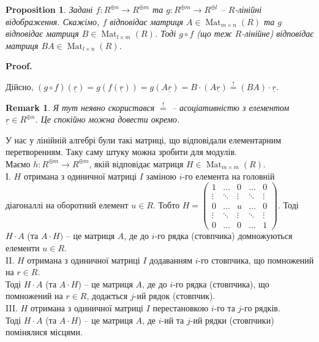 \documentclass[a4paper, 10pt]{article}
\makeatletter
\theoremstyle{theoremdd}
\theoremstyle{theoremdd}
\theoremstyle{theoremdd}
\theoremstyle{theoremdd}
\theoremstyle{theoremdd}
\theoremstyle{theoremdd}
\theoremstyle{theoremdd}
\theoremstyle{theoremdd}
\theoremstyle{theoremdd}
\newtheorem{proposition}[theorem]{Proposition}
\theoremstyle{theoremdd}
\theoremstyle{theoremdd}
\newtheorem{remark}[theorem]{Remark}
\theoremstyle{theoremdd}
\theoremstyle{theoremdd}
\theoremstyle{theoremdd}
\theoremstyle{theoremdd}
\renewenvironment{proof}[1][Proof.\\]{\par
\pushQED{\hfill \qed}%
\normalfont \topsep6\p@\@plus6\p@\relax
\trivlist
\item\relax
{\bfseries
#1\@addpunct{.}}\hspace\labelsep\ignorespaces
}{%
\popQED\endtrivlist\@endpefalse
}
\DeclareMathOperator{\Mat}{Mat}
\makeatother
\begin{document}
\begin{proposition}
Задані $f \colon R^{\oplus n} \to R^{\oplus m}$ та $g \colon R^{\oplus m} \to R^{\oplus l}$ -- $R$-лінійні відображення. Скажімо, $f$ відповідає матриця $A \in \Mat_{m \times n}(R)$ та $g$ відповідає матриця $B \in \Mat_{l \times m}(R)$. Тоді $g \circ f$ (що теж $R$-лінійне) відповідає матриця $B A \in \Mat_{l \times n}(R)$.
\end{proposition}

\begin{proof}
Дійсно, $(g \circ f)(\underline{r}) = g(f(\underline{r})) = g(A \underline{r}) = B \cdot (A \underline{r}) \overset{!}{=} (BA) \cdot \underline{r}$.
\end{proof}

\begin{remark}
Я тут неявно скористався $\overset{!}{=}$ -- асоціативністю з елементом $\underline{r} \in R^{\oplus n}$. Це спокійно можна довести окремо.
\end{remark}

У нас у лінійній алгебрі були такі матриці, що відповідали елементарним перетворенням. Таку саму штуку можна зробити для модулів.\\
Маємо $h \colon R^{\oplus m} \to R^{\oplus m}$, якій відповідає матриця $H \in \Mat_{m \times m}(R)$.\\
I. $H$ отримана з одиничної матриці $I$ заміною $i$-го елемента на головній діагоналлі на оборотний елемент $u \in R$. Тобто $H = \begin{pmatrix}
1 & \dots & 0 & \dots & 0 \\
\vdots & \ddots & \vdots & \ddots & \vdots \\
0 & \dots & u & \dots & 0 \\
\vdots & \ddots & \vdots & \ddots & \vdots \\
0 & \dots & 0 & \dots & 1
\end{pmatrix}$.
Тоді $H \cdot A$ (та $A \cdot H)$ -- це матриця $A$, де до $i$-го рядка (стовпчика) домножуються елементи $u \in R$.
\bigskip \\
II. $H$ отримана з одиничної матриці $I$ додаванням $i$-го стовпчика, що помножений на $r \in R$.\\
Тоді $H \cdot A$ (та $A \cdot H$) -- це матриця $A$, де до $i$-го рядка (стовпчика), що помножений на $r \in R$, додається $j$-ий рядок (стовпчик).
\bigskip \\
III. $H$ отримана з одиничної матриці $I$ перестановкою $i$-го та $j$-го рядків.\\
Тоді $H \cdot A$ (та $A \cdot H$) -- це матриця $A$, де $i$-ий та $j$-ий рядки (стовпчики) помінялися місцями.
\end{document}
